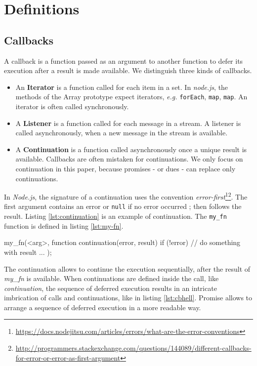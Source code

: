 \section{Definitions} \label{section:definitions}

\subsection{Callbacks} \label{section:definitions:callback}

A callback is a function passed as an argument to another function to defer its execution after a result is made available.
We distinguish three kinds of callbacks.
\begin{itemize}
  \item An \textbf{Iterator} is a function called for each item in a set.
  In \textit{node.js}, the methods of the Array prototype expect iterators, \textit{e.g.} \texttt{forEach}, \texttt{map}, \texttt{map}.
  An iterator is often called synchronously.
  \item A \textbf{Listener} is a function called for each message in a stream.
  A listener is called asynchronously, when a new message in the stream is available.
  \item A \textbf{Continuation} is a function called asynchronously once a unique result is available.
  Callbacks are often mistaken for continuations.
  We only focus on continuation in this paper, because promises - or dues - can replace only continuations.
\end{itemize}

In \textit{Node.js}, the signature of a continuation uses the convention \textit{error-first}\footnote{\label{ftn:error-first}\url{https://docs.nodejitsu.com/articles/errors/what-are-the-error-conventions}}\footnote{\url{http://programmers.stackexchange.com/questions/144089/different-callbacks-for-error-or-error-as-first-argument}}.
The first argument contains an error or \texttt{null} if no error occurred ; then follows the result.
Listing \ref{lst:continuation} is an example of continuation.
The \texttt{my_fn} function is defined in listing \ref{lst:my-fn}.

\begin{code}[js, %
             caption={Example of a continuation}, %
             label={lst:continuation}] %
my_fn(<arg>, function continuation(error, result) {
  if (!error) {
    // do something with result ...
  }
});
\end{code}

The continuation allows to continue the execution sequentially, after the result of \textit{my_fn} is available. 
When continuations are defined inside the call, like \textit{continuation}, the sequence of deferred execution results in an intricate imbrication of calls and continuations, like in listing \ref{lst:cbhell}.
Promise allows to arrange a sequence of deferred execution in a more readable way.

